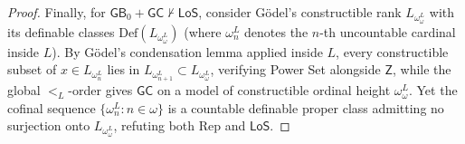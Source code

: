 \begin{proof}
Finally, for $\mathsf{GB}_0 + \mathsf{GC} \not\vdash \mathsf{LoS}$, consider G\"odel's constructible rank $L_{\omega_\omega^L}$ with its definable classes $\mathrm{Def}(L_{\omega_\omega^L})$ (where $\omega_n^L$ denotes the $n$-th uncountable cardinal inside $L$). By G\"odel's condensation lemma applied inside $L$, every constructible subset of $x \in L_{\omega_n^L}$ lies in $L_{\omega_{n+1}^L} \subset L_{\omega_\omega^L}$, verifying Power Set alongside $\mathsf{Z}$, while the global $<_L$-order gives $\mathsf{GC}$ on a model of constructible ordinal height $\omega_\omega^L$. Yet the cofinal sequence $\{\omega_n^L : n \in \omega\}$ is a countable definable proper class admitting no surjection onto $L_{\omega_\omega^L}$, refuting both $\mathrm{Rep}$ and $\mathsf{LoS}$.
\end{proof}

